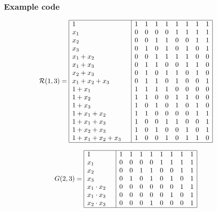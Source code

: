 \documentclass[xcolor=xvgnames]{beamer}
\newcommand{\RM}[2]{\ensuremath{\mathcal{R}(#1,#2)}}
\begin{document}

\begin{frame}
\frametitle{Example code}
 \begin{equation*}

\RM{1}{3} = \begin{array}{|l|cccccccc|}
\hline
1 \quad&  	 1&1&1&1&1&1&1&1 \\
x_1 \quad& 	 0&0&0&0&1&1&1&1 \\
x_2 \quad& 	 0&0&1&1&0&0&1&1 \\
x_3 \quad&	 0&1&0&1&0&1&0&1 \\
x_1+x_2 \quad&    0&0&1&1&1&1&0&0 \\
x_1+x_3 \quad&	 0&1&1&0&0&1&1&0 \\
x_2+x_3 \quad&	 0&1&0&1&1&0&1&0 \\
x_1+x_2+x_3 \quad& 0&1&1&0&1&0&0&1 \\
1+x_1	\quad&	 1&1&1&1&0&0&0&0 \\
1+x_2	\quad&	 1&1&0&0&1&1&0&0 \\
1+x_3	\quad&	 1&0&1&0&1&0&1&0 \\
1+x_1+x_2 \quad&	 1&1&0&0&0&0&1&1 \\
1+x_1+x_3 \quad&	 1&0&0&1&1&0&0&1 \\
1+x_2+x_3 \quad&	 1&0&1&0&0&1&0&1 \\
1+x_1+x_2+x_3\quad& 1&0&0&1&0&1&1&0 \\
\hline
\end{array}
\end{equation*}

\end{frame}


\begin{frame}
 \begin{equation*}
G(2,3) =\begin{array}{|l|cccccccc|}
\hline
1 \quad&         1&1&1&1&1&1&1&1 \\
x_1 \quad&       0&0&0&0&1&1&1&1 \\
x_2 \quad&       0&0&1&1&0&0&1&1 \\
x_3 \quad&       0&1&0&1&0&1&0&1 \\
x_1\cdot x_2 \quad& 0&0&0&0&0&0&1&1 \\ 
x_1\cdot x_3 \quad& 0&0&0&0&0&1&0&1 \\
x_2\cdot x_3 \quad& 0&0&0&1&0&0&0&1 \\
\hline
\end{array}
\end{equation*}
\end{frame}
\end{document}
